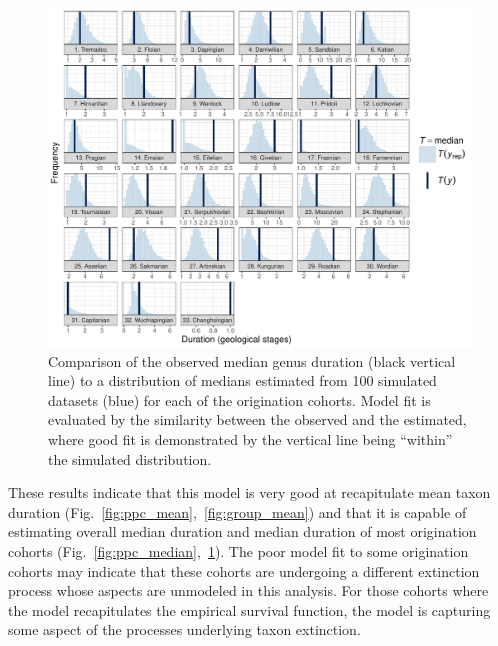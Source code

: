 \documentclass[11pt]{article}
\begin{document}
\begin{figure}[ht]
  \centering
  \includegraphics[height = 0.5\textheight,width=\textwidth,keepaspectratio=true]{figure/ppc_med_group_cweib_cens}
  \caption{ Comparison of the observed median genus duration (black vertical line) to a distribution of medians estimated from 100 simulated datasets (blue) for each of the origination cohorts. Model fit is evaluated by the similarity between the observed and the estimated, where good fit is demonstrated by the vertical line being ``within'' the simulated distribution. }
  \label{fig:group_median}
\end{figure}

These results indicate that this model is very good at recapitulate mean taxon duration (Fig.~\ref{fig:ppc_mean},~\ref{fig:group_mean}) and that it is capable of estimating overall median duration and median duration of most origination cohorts (Fig.~\ref{fig:ppc_median},~\ref{fig:group_median}). The poor model fit to some origination cohorts may indicate that these cohorts are undergoing a different extinction process whose aspects are unmodeled in this analysis. For those cohorts where the model recapitulates the empirical survival function, the model is capturing some aspect of the processes underlying taxon extinction.
\end{document}
